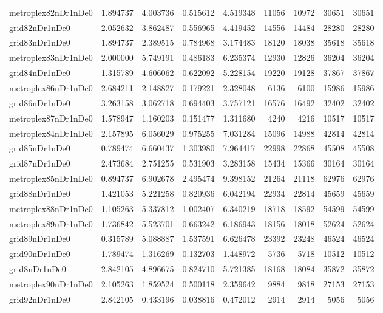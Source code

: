 \begin{longtable}{|l|r|r|r|r|r|r|r|r|}
metroplex82nDr1nDe0 & 1.894737 & 4.003736 & 0.515612 & 4.519348 & 11056 & 10972 & 30651 & 30651 \\
grid82nDr1nDe0 & 2.052632 & 3.862487 & 0.556965 & 4.419452 & 14556 & 14484 & 28280 & 28280 \\
grid83nDr1nDe0 & 1.894737 & 2.389515 & 0.784968 & 3.174483 & 18120 & 18038 & 35618 & 35618 \\
metroplex83nDr1nDe0 & 2.000000 & 5.749191 & 0.486183 & 6.235374 & 12930 & 12826 & 36204 & 36204 \\
grid84nDr1nDe0 & 1.315789 & 4.606062 & 0.622092 & 5.228154 & 19220 & 19128 & 37867 & 37867 \\
metroplex86nDr1nDe0 & 2.684211 & 2.148827 & 0.179221 & 2.328048 & 6136 & 6100 & 15986 & 15986 \\
grid86nDr1nDe0 & 3.263158 & 3.062718 & 0.694403 & 3.757121 & 16576 & 16492 & 32402 & 32402 \\
metroplex87nDr1nDe0 & 1.578947 & 1.160203 & 0.151477 & 1.311680 & 4240 & 4216 & 10517 & 10517 \\
metroplex84nDr1nDe0 & 2.157895 & 6.056029 & 0.975255 & 7.031284 & 15096 & 14988 & 42814 & 42814 \\
grid85nDr1nDe0 & 0.789474 & 6.660437 & 1.303980 & 7.964417 & 22998 & 22868 & 45508 & 45508 \\
grid87nDr1nDe0 & 2.473684 & 2.751255 & 0.531903 & 3.283158 & 15434 & 15366 & 30164 & 30164 \\
metroplex85nDr1nDe0 & 0.894737 & 6.902678 & 2.495474 & 9.398152 & 21264 & 21118 & 62976 & 62976 \\
grid88nDr1nDe0 & 1.421053 & 5.221258 & 0.820936 & 6.042194 & 22934 & 22814 & 45659 & 45659 \\
metroplex88nDr1nDe0 & 1.105263 & 5.337812 & 1.002407 & 6.340219 & 18718 & 18592 & 54599 & 54599 \\
metroplex89nDr1nDe0 & 1.736842 & 5.523701 & 0.663242 & 6.186943 & 18156 & 18018 & 52624 & 52624 \\
grid89nDr1nDe0 & 0.315789 & 5.088887 & 1.537591 & 6.626478 & 23392 & 23248 & 46524 & 46524 \\
grid90nDr1nDe0 & 1.789474 & 1.316269 & 0.132703 & 1.448972 & 5736 & 5718 & 10512 & 10512 \\
grid8nDr1nDe0 & 2.842105 & 4.896675 & 0.824710 & 5.721385 & 18168 & 18084 & 35872 & 35872 \\
metroplex90nDr1nDe0 & 2.105263 & 1.859524 & 0.500118 & 2.359642 & 9884 & 9818 & 27153 & 27153 \\
grid92nDr1nDe0 & 2.842105 & 0.433196 & 0.038816 & 0.472012 & 2914 & 2914 & 5056 & 5056 \\

\end{longtable}

